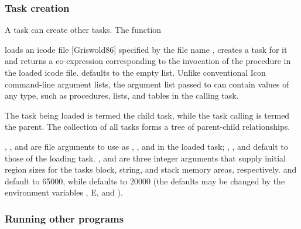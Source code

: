 \subsubsection{Task creation}

A task can create other tasks. The function 


\noindent loads an icode file [Griswold86] specified by the file name
, creates a task for it and returns a
co-expression corresponding to the invocation of the procedure
 in the loaded icode file.
\textstyleSourceText{ }defaults to the
empty list. Unlike conventional Icon command-line argument lists, the
argument list passed to\textstyleSourceText{
} can contain values of any type,
such as procedures, lists, and tables in the calling task.

The task being loaded is termed the child task, while the task calling
 is termed the parent. The
collection of all tasks forms a tree of parent-child
relationships.

, ,
and \textstyleSourceText{ }are file
arguments to use as ,
, and
 in the loaded task;
,
, and
\textstyleSourceText{\textrm{
}}default to those of the loading task.\textstyleSourceText{\textrm{
}} ,
and  are three integer arguments that
supply initial region sizes for the task{\textquotesingle}s block,
string, and stack memory areas, respectively.
 and 
default to 65000, while defaults to
20000 (the defaults may be changed by the environment variables
,
\textsf{E}, and
). 

\subsubsection{Running other programs}

